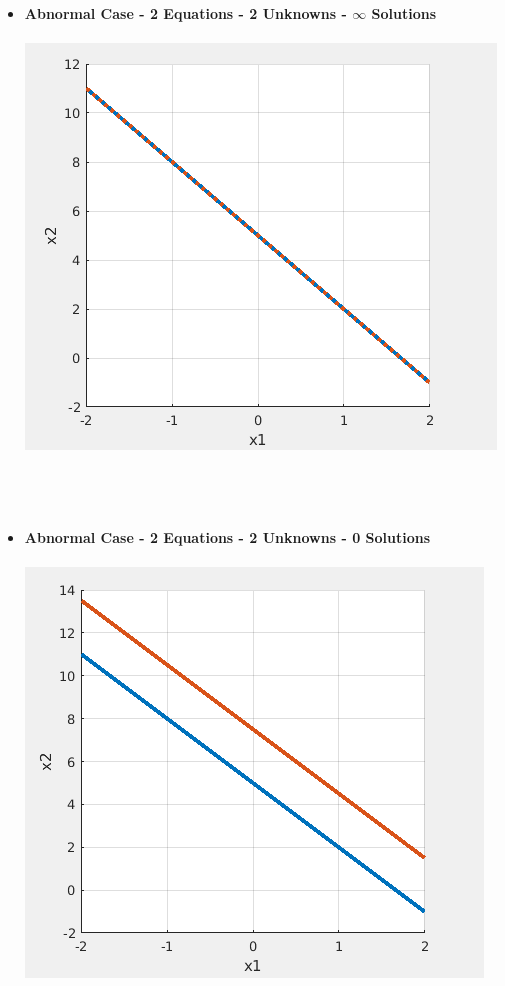 \documentclass[11pt]{article}
\begin{document}
\begin{itemize}
\begin{itemize}
\newpage
\item {\bf Abnormal Case - 2 Equations - 2 Unknowns - $\infty$ Solutions} \\\\ \includegraphics[scale=1]{lecture5_fig2.png} \\\\
\\\\

\newpage
\item {\bf Abnormal Case - 2 Equations - 2 Unknowns - 0 Solutions} \\\\ \includegraphics[scale=1]{lecture5_fig3.png} \\\\
\\\\


\end{itemize}
\end{itemize}
\end{document}
